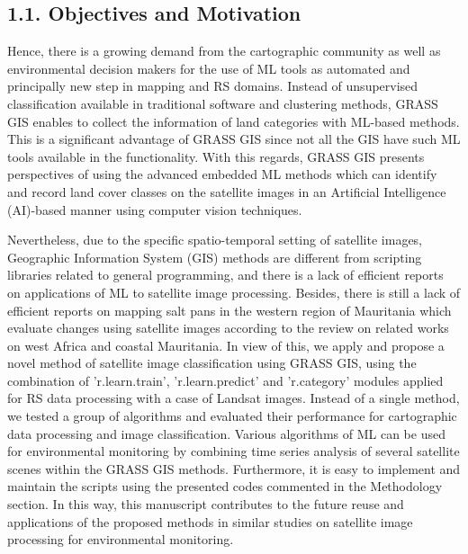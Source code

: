 \documentclass[12pt,a4paper,oneside]{article}
\def \newpar{\vspace{6pt}}
\begin{document}
\subsection*{1.1. Objectives and Motivation}

\newpar Hence, there is a growing demand from the cartographic community as well as environmental decision makers for the use of ML tools as automated and principally new step in mapping and RS domains. Instead of unsupervised classification available in traditional software and clustering methods, GRASS GIS enables to collect the information of land categories with ML-based methods. This is a significant advantage of GRASS GIS since not all the GIS have such ML tools available in the functionality. With this regards, GRASS GIS presents perspectives of using the advanced embedded ML methods which can identify and record land cover classes on the satellite images in an Artificial Intelligence (AI)-based manner using computer vision techniques. 

\newpar Nevertheless, due to the specific spatio-temporal setting of satellite images, Geographic Information System (GIS) methods are different from scripting libraries related to general programming, and there is a lack of efficient reports on applications of ML to satellite image processing. Besides, there is still a lack of efficient reports on mapping salt pans in the western region of Mauritania which evaluate changes using satellite images according to the review on related works on west Africa and coastal Mauritania. In view of this, we apply and propose a novel method of satellite image classification using GRASS GIS, using the combination of 'r.learn.train', 'r.learn.predict' and 'r.category' modules applied for RS data processing with a case of Landsat images. Instead of a single method, we tested a group of algorithms and evaluated their performance for cartographic data processing and image classification. Various algorithms of ML can be used for environmental monitoring by combining time series analysis of several satellite scenes within the GRASS GIS methods. Furthermore, it is easy to implement and maintain the scripts using the presented codes commented in the Methodology section. In this way, this manuscript contributes to the future reuse and applications of the proposed methods in similar studies on satellite image processing for environmental monitoring.
\end{document}
